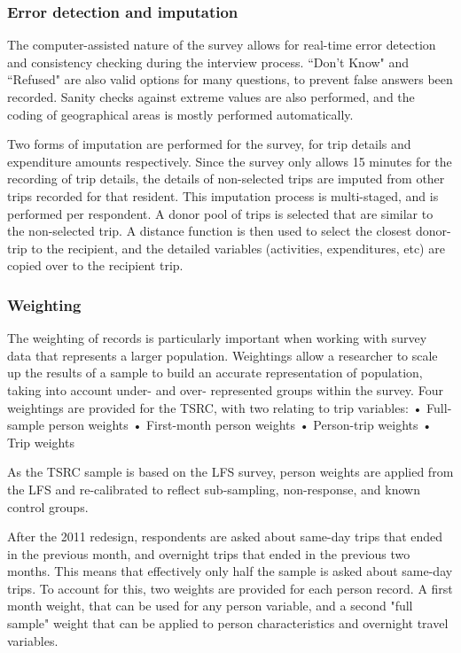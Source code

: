 \subsubsection{Error detection and imputation}
The computer-assisted nature of the survey allows for real-time error detection and consistency checking during the interview process. ``Don’t Know" and ``Refused" are also valid options for many questions, to prevent false answers been recorded. Sanity checks against extreme values are also performed, and the coding of geographical areas is mostly performed automatically.

Two forms of imputation are performed for the survey, for trip details and expenditure amounts respectively. Since the survey only allows 15 minutes for the recording of trip details, the details of non-selected trips are imputed from other trips recorded for that resident. This imputation process is multi-staged, and is performed per respondent. A donor pool of trips is selected that are similar to the non-selected trip. A distance function is then used to select the closest donor-trip to the recipient, and the detailed variables (activities, expenditures, etc) are copied over to the recipient trip.

\subsubsection{Weighting}
The weighting of records is particularly important when working with survey data that represents a larger population. Weightings allow a researcher to scale up the results of a sample to build an accurate representation of population, taking into account under- and over- represented groups within the survey. Four weightings are provided for the TSRC, with two relating to trip variables:
•	Full-sample person weights
•	First-month person weights
•	Person-trip weights
•	Trip weights

As the TSRC sample is based on the LFS survey, person weights are applied from the LFS and re-calibrated to reflect sub-sampling, non-response, and known control groups. 

After the 2011 redesign, respondents are asked about same-day trips that ended in the previous month, and overnight trips that ended in the previous two months. This means that effectively only half the sample is asked about same-day trips. To account for this, two weights are provided for each person record. A first month weight, that can be used for any person variable, and a second "full sample" weight that can be applied to person characteristics and overnight travel variables.

